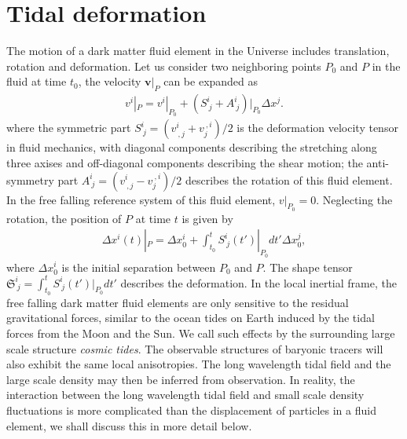 \documentclass[aps,prd,twocolumn,showpacs,superscriptaddress,groupedaddress,nofootinbib]{revtex4}  %
\begin{document}
\section{Tidal deformation}

The motion of a dark matter fluid element in the Universe includes 
translation, rotation and deformation. 
Let us consider two neighboring points $P_0$ 
and $P$ in the fluid at time $t_0$, the velocity  
$\bm{v}|_{P}$ can be expanded as
\begin{eqnarray}
v^i|_{P}=v^i|_{P_0}+(S^i_{\ j}+A^i_{\ j})|_{P_0}\Delta x^j.
\end{eqnarray}
where the symmetric part $S^i_{\ j}=(v^i_{\ ,j}+v_j^{\ ,i})/2$  is the deformation velocity tensor in fluid 
mechanics, with diagonal components describing the stretching along three
axises and off-diagonal components describing the shear motion;
the anti-symmetry part $A^i_{\ j}=(v^i_{\ ,j}-v_j^{\ ,i})/2$ describes the rotation of this fluid element.
In the free falling reference system of this fluid element, $v|_{P_0}=0$.
Neglecting the rotation,  the position of $P$ at time $t$ is given by 
\begin{eqnarray}
\Delta x^i(t)|_P=\Delta x^i_0+\int_{t_0}^tS^i_{\ j}(t{'})|_{P_0}dt{'}  \Delta x_0^j,
\end{eqnarray}
where $\Delta x_0^i$ is the initial separation between $P_0$ and $P$.
The shape tensor $\mathfrak{S}^i_{\ j}=\int_{t_0}^tS^i_{\ j}(t{'})|_{P_0}dt{'}$ 
describes the deformation. 
In the local inertial frame, the free falling dark matter fluid elements 
are only sensitive to the residual gravitational forces, similar to the 
ocean tides on Earth induced by the tidal forces from the Moon and the Sun.
We call such effects by the surrounding large scale structure {\it cosmic tides}.  
The observable structures of baryonic tracers
 will also exhibit the same local anisotropies. The long wavelength tidal field and the 
large scale density may then be inferred from observation. In reality, the 
interaction between the long wavelength tidal field
and small scale density fluctuations is more complicated than the displacement 
of particles in a fluid element, we shall discuss this in more detail below. 
\end{document}

